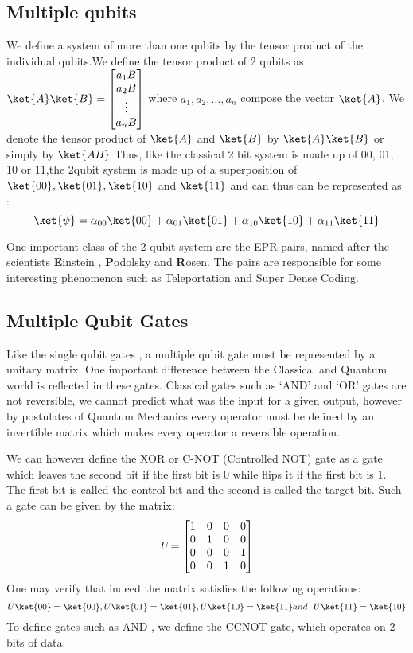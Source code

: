 \subsection{Multiple qubits}
We define a system of more than one qubits by the tensor product of the individual qubits.We define the tensor product of 2 qubits as 
$\ket{A}\ket{B} = \begin{bmatrix}a_1 B\\a_2B\\ \vdots \\ a_nB  \end{bmatrix}$ where $a_1 , a_2 ,\hdots ,a_n$ compose the vector $\ket{A}$. We denote the tensor product of $\ket{A}$ and $\ket{B}$
by $\ket{A}\ket{B}$ or simply by $\ket{AB}$
Thus, like the classical 2 bit system is made up of 00, 01, 10 or 11,the 2qubit system is made up of a superposition of $\ket{00},\ket{01},\ket{10}$ and $\ket{11}$ and can thus can be represented as :
$$\ket{\psi} = \alpha_{00} \ket{00} + \alpha_{01} \ket{01} + \alpha_{10} \ket{10} + \alpha_{11}\ket{11}$$
\par
One important class of the 2 qubit system are the EPR pairs, named after the scientists \textbf{E}instein , \textbf{P}odolsky and \textbf{R}osen. The pairs are responsible for some interesting phenomenon such as Teleportation and Super Dense Coding.

\subsection{Multiple Qubit Gates}
Like the single qubit gates , a multiple qubit gate must be represented by a unitary matrix. One important difference between the Classical and Quantum world is reflected in these gates. Classical gates such as `AND' and `OR' gates are not reversible, we cannot predict what was the input for a given output, however by postulates of Quantum Mechanics every operator must be defined by an invertible matrix which makes every operator a reversible operation.\par
We can however define the XOR or C-NOT (Controlled NOT) gate as a gate which leaves the second bit if the first bit is 0 while flips it if the first bit is 1. The first bit is called the control bit and the second is called the target bit.
Such a gate can be given by the matrix:
$$\emph{U} = \begin{bmatrix}1 & 0& 0&0\\0&1&0&0\\0&0&0&1\\0&0&1&0 \end{bmatrix} $$ One may verify that indeed the matrix satisfies the following operations:
$$U\ket{00} = \ket{00} , U\ket{01} = \ket{01} , U\ket{10} = \ket{11} and ~~U\ket{11}=\ket{10}$$
To define gates such as AND , we define the CCNOT gate, which operates on 2 bits of data.